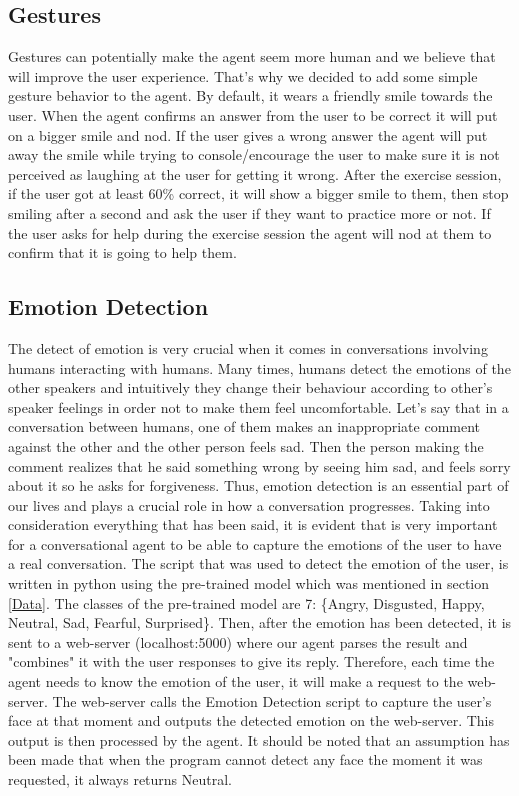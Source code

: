 \subsection{Gestures}
Gestures can potentially make the agent seem more human and we believe that will improve the user experience. That's why we decided to add some simple gesture behavior to the agent. By default, it wears a friendly smile towards the user. When the agent confirms an answer from the user to be correct it will put on a bigger smile and nod. If the user gives a wrong answer the agent will put away the smile while trying to console/encourage the user to make sure it is not perceived as laughing at the user for getting it wrong. After the exercise session, if the user got at least 60\% correct, it will show a bigger smile to them, then stop smiling after a second and ask the user if they want to practice more or not. If the user asks for help during the exercise session the agent will nod at them to confirm that it is going to help them.


\subsection{Emotion Detection}
The detect of emotion is very crucial when it comes in conversations involving humans interacting with humans. Many times, humans detect the emotions of the other speakers and intuitively they change their behaviour according to other's speaker feelings in order not to make them feel uncomfortable. Let's say that in a conversation between humans, one of them makes an inappropriate comment against the other and the other person feels sad. Then the person making the comment realizes that he said something wrong by seeing him sad, and feels sorry about it so he asks for forgiveness. Thus,  emotion detection is an essential part of our lives and plays a crucial role in how a conversation progresses.
\newline
\newline
Taking into consideration everything that has been said, it is evident that is very important for a conversational agent to be able to capture the emotions of the user to have a real conversation. The script that was used to detect the emotion of the user, is written in python using the pre-trained model which was mentioned in section \ref{Data}. The classes of the pre-trained model are 7: \{Angry, Disgusted, Happy, Neutral, Sad, Fearful, Surprised\}. Then, after the emotion has been detected, it is sent to a web-server (localhost:5000) where our agent parses the result and "combines" it with the user responses to give its reply. Therefore, each time the agent needs to know the emotion of the user, it will make a request to the web-server. The web-server calls the Emotion Detection script to capture the user's face at that moment and outputs the detected emotion on the web-server. This output is then processed by the agent. It should be noted that an assumption has been made that when the program cannot detect any face the moment it was requested, it always returns Neutral. 

